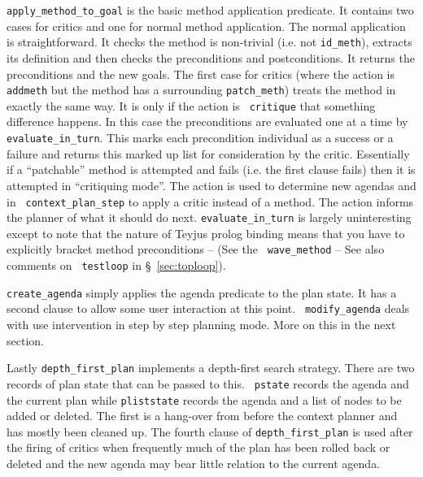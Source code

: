 {\tt apply\_method\_to\_goal} is the
basic method application predicate.  It contains two cases for
critics and one for normal method application.  The
normal application is straightforward.  It checks the method is
non-trivial (i.e. not {\tt id\_meth}), extracts its
definition and then checks the preconditions and
postconditions.  It returns the preconditions and
the new goals.  The first case for critics (where the
action is {\tt addmeth} but the method
has a surrounding {\tt patch\_meth}) treats the
method in exactly the same way.  It is only if the action is {\tt
  critique} that something difference happens.  In
this case the preconditions are evaluated one at a time by {\tt
  evaluate\_in\_turn}.  This marks each
precondition individual as a success or a failure and returns this
marked up list for consideration by the critic.  Essentially if a
``patchable'' method is attempted and fails (i.e. the first clause
fails) then it is attempted in ``critiquing mode''.  The action is
used to determine new agendas and in {\tt
  context\_plan\_step} to apply a critic
instead of a method.  The action informs the planner of what it should
do next.  {\tt evaluate\_in\_turn} is
largely uninteresting except to note that the nature of Teyjus prolog
binding means that you have to explicitly bracket method
preconditions -- (See the {\tt
  wave\_method} -- See also comments on {\tt
  testloop} in \S~\ref{sec:toploop}).

{\tt create\_agenda} simply applies the agenda
predicate to the plan state.  It has a second
clause to allow some user interaction at this point.  {\tt
  modify\_agenda} deals with use intervention in 
step by step planning mode.  More on this 
in the next section.

Lastly {\tt depth\_first\_plan} implements a 
depth-first search strategy.  There are two records of plan
state that can be passed to this.  {\tt
  pstate} records the agenda and the current plan while
{\tt pliststate} records the agenda and a list of
nodes to be added or deleted.  The first is a hang-over from before
the context planner and has mostly been 
cleaned up.  The fourth clause of {\tt depth\_first\_plan} is used
after the firing of critics when frequently much of the
plan has been rolled back or deleted and the new agenda may bear
little relation to the current agenda.

